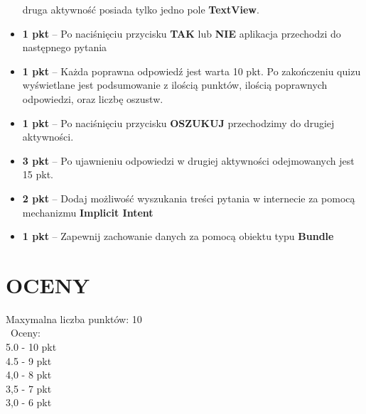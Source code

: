\documentclass[a4paper]{article}
\begin{document}
\begin{itemize}
druga aktywność posiada tylko jedno pole \textbf{TextView}.

\item \textbf{1 pkt} -- Po naciśnięciu przycisku \textbf{TAK} lub \textbf{NIE} aplikacja przechodzi do następnego pytania

\item \textbf{1 pkt} -- Każda poprawna odpowiedź jest warta 10 pkt. Po zakończeniu quizu wyświetlane jest podsumowanie z ilością punktów, ilością poprawnych odpowiedzi, oraz liczbę oszustw.

\item \textbf{1 pkt} -- Po naciśnięciu przycisku \textbf{OSZUKUJ} przechodzimy do drugiej aktywności.

\item \textbf{3 pkt} -- Po ujawnieniu odpowiedzi w drugiej aktywności odejmowanych jest 15 pkt.

\item \textbf{2 pkt} -- Dodaj możliwość wyszukania treści pytania w internecie za pomocą mechanizmu \textbf{Implicit Intent}

\item \textbf{1 pkt} -- Zapewnij zachowanie danych za pomocą obiektu typu \textbf{Bundle}
\end{itemize}

\section*{OCENY}
Maxymalna liczba punktów: 10\\\
Oceny:\\
5.0 - 10 pkt\\
4.5 - 9 pkt\\
4,0 - 8 pkt\\
3,5 - 7 pkt\\
3,0 - 6 pkt
\end{document}
